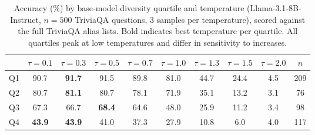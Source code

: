 \begin{table}[h]
\centering
\small
\begin{tabular}{lccccccccc}
\toprule
& $\tau\!=\!0.1$ & $\tau\!=\!0.3$ & $\tau\!=\!0.5$ & $\tau\!=\!0.7$ & $\tau\!=\!1.0$ & $\tau\!=\!1.3$ & $\tau\!=\!1.5$ & $\tau\!=\!2.0$ & $n$ \\
\midrule
Q1 & 90.7 & \textbf{91.7} & 91.5 & 89.8 & 81.0 & 44.7 & 24.4 & 4.5 & 209 \\
Q2 & 80.7 & \textbf{81.1} & 80.7 & 78.1 & 71.9 & 35.1 & 13.2 & 3.1 & 76 \\
Q3 & 67.3 & 66.7 & \textbf{68.4} & 64.6 & 48.0 & 25.9 & 11.2 & 3.4 & 98 \\
Q4 & \textbf{43.9} & \textbf{43.9} & 41.0 & 37.3 & 27.9 & 10.8 & 6.0 & 4.0 & 117 \\
\bottomrule
\end{tabular}
\caption{Accuracy (\%) by base-model diversity quartile and temperature (Llama-3.1-8B-Instruct, $n=500$ TriviaQA questions, 3 samples per temperature), scored against the full TriviaQA alias lists. Bold indicates best temperature per quartile. All quartiles peak at low temperatures and differ in sensitivity to increases.}
\label{tab:pred4-results}
\end{table}
